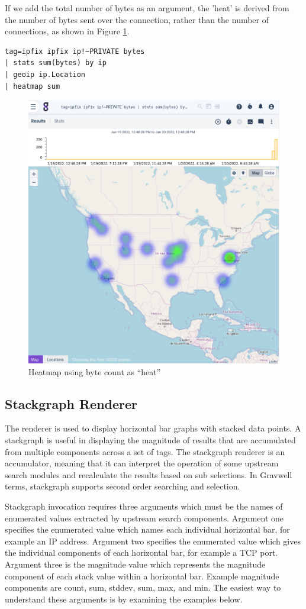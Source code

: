 If we add the total number of bytes as an argument, the 'heat' is
derived from the number of bytes sent over the connection, rather than
the number of connections, as shown in Figure \ref{fig:heatmap-bytes}.

\begin{Verbatim}[breaklines=true]
tag=ipfix ipfix ip!~PRIVATE bytes 
| stats sum(bytes) by ip 
| geoip ip.Location 
| heatmap sum
\end{Verbatim}

\begin{figure}
	\includegraphics[width=0.6\linewidth]{images/heatmap-bytes.png}
	\caption{Heatmap using byte count as ``heat''}
	\label{fig:heatmap-bytes}
\end{figure}

\clearpage

\subsection{Stackgraph Renderer}
The  renderer is used to display horizontal bar graphs
with stacked data points. A stackgraph is useful in displaying the
magnitude of results that are accumulated from multiple components
across a set of tags. The stackgraph renderer is an accumulator,
meaning that it can interpret the operation of some upstream search
modules and recalculate the results based on sub selections. In Gravwell
terms, stackgraph supports second order searching and selection.

Stackgraph invocation requires three arguments which must be the names
of enumerated values extracted by upstream search components. Argument
one specifies the enumerated value which names each individual
horizontal bar, for example an IP address. Argument two specifies the
enumerated value which gives the individual components of each
horizontal bar, for example a TCP port. Argument three is the magnitude
value which represents the magnitude component of each stack value
within a horizontal bar. Example magnitude components are count, sum,
stddev, sum, max, and min. The easiest way to understand these arguments
is by examining the examples below.

